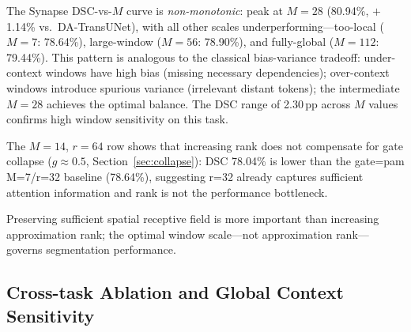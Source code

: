 The Synapse DSC-vs-$M$ curve is \emph{non-monotonic}: peak at $M{=}28$ (80.94\%, $+$1.14\% vs.\ DA-TransUNet), with all other scales underperforming---too-local ($M{=}7$: 78.64\%), large-window ($M{=}56$: 78.90\%), and fully-global ($M{=}112$: 79.44\%). This pattern is analogous to the classical bias-variance tradeoff: under-context windows have high bias (missing necessary dependencies); over-context windows introduce spurious variance (irrelevant distant tokens); the intermediate $M{=}28$ achieves the optimal balance. The DSC range of 2.30\,pp across $M$ values confirms high window sensitivity on this task.

The $M{=}14$, $r{=}64$ row shows that increasing rank does not compensate for gate collapse ($g{\approx}0.5$, Section~\ref{sec:collapse}): DSC 78.04\% is lower than the gate=pam M=7/r=32 baseline (78.64\%), suggesting r=32 already captures sufficient attention information and rank is not the performance bottleneck.

Preserving sufficient spatial receptive field is more important than increasing approximation rank; the optimal window scale---not approximation rank---governs segmentation performance.

\subsection{Cross-task Ablation and Global Context Sensitivity}
\label{sec:obs2}

